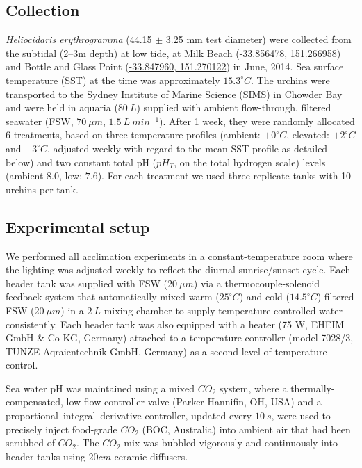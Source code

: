\documentclass[oneside, a4paper]{memoir}
\theoremstyle{definition}
\theoremstyle{definition}
\theoremstyle{definition}
\theoremstyle{remark}
\begin{document}
\subsection{Collection}\label{collection}

\emph{Heliocidaris erythrogramma} (44.15 \(\pm\) 3.25 mm test diameter)
were collected from the subtidal (2--3m depth) at low tide, at Milk
Beach
(\href{https://www.google.com/maps/?q=-33.856478,151.266958}{-33.856478,
151.266958}) and Bottle and Glass Point
(\href{https://www.google.com/maps/?q=-33.847960,151.270122}{-33.847960,
151.270122}) in June, 2014. Sea surface temperature (SST) at the time
was approximately \(15.3^{\circ}C\). The urchins were transported to the
Sydney Institute of Marine Science (SIMS) in Chowder Bay and were held
in aquaria (\(80\ L\)) supplied with ambient flow-through, filtered
seawater (FSW, \(70\ \mu m\), \(1.5\ L\ min^{-1}\)). After 1 week, they
were randomly allocated 6 treatments, based on three temperature
profiles (ambient: \(+0^{\circ}C\), elevated: \(+2^{\circ}C\) and
\(+3^{\circ}C\), adjusted weekly with regard to the mean SST profile as
detailed below) and two constant total pH (\(pH_T\), on the total
hydrogen scale) levels (ambient \(8.0\), low: \(7.6\)). For each
treatment we used three replicate tanks with 10 urchins per tank.

\subsection{Experimental setup}\label{experimental-setup}

We performed all acclimation experiments in a constant-temperature room
where the lighting was adjusted weekly to reflect the diurnal
sunrise/sunset cycle. Each header tank was supplied with FSW
(\(20\ \mu m\)) via a thermocouple-solenoid feedback system that
automatically mixed warm (\(25^{\circ}C\)) and cold (\(14.5^{\circ}C\))
filtered FSW (\(20\ \mu m\)) in a \(2\ L\) mixing chamber to supply
temperature-controlled water consistently. Each header tank was also
equipped with a heater (75 W, EHEIM GmbH \& Co KG, Germany) attached to
a temperature controller (model 7028/3, TUNZE Aqraientechnik GmbH,
Germany) as a second level of temperature control.

Sea water pH was maintained using a mixed \(CO_2\) system, where a
thermally-compensated, low-flow controller valve (Parker Hannifin, OH,
USA) and a proportional--integral--derivative controller, updated every
\(10\ s\), were used to precisely inject food-grade \(CO_2\) (BOC,
Australia) into ambient air that had been scrubbed of \(CO_2\). The
\(CO_2\)-mix was bubbled vigorously and continuously into header tanks
using \(20 cm\) ceramic diffusers.
\end{document}
